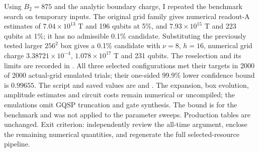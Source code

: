 \documentclass[11pt,a4paper]{article}
\begin{document}
Using $B_2=875$ and the analytic boundary charge, I repeated the benchmark
search on temporary inputs. The original grid family gives numerical
readout-A estimates of $7.04\times10^{13}$ T and 196 qubits at 5\%, and
$7.93\times10^{15}$ T and 223 qubits at 1\%; it has no admissible 0.1\%
candidate. Substituting the previously tested larger $256^2$ box gives a
0.1\% candidate with $\nu=8$, $h=16$, numerical grid charge
$3.38721\times10^{-4}$, $1.078\times10^{17}$ T and 231 qubits. The
reselection and its limits are recorded in
. All three selected
configurations met their targets in 2000 of 2000 actual-grid emulated trials;
their one-sided 99.9\% lower confidence bound is $0.99655$. The script and
saved values are  and
. The expansion, box
evolution, amplitude estimates and circuit costs remain numerical or
uncompiled; the emulations omit GQSP truncation and gate synthesis. The bound
is for the benchmark and was not applied to the
parameter sweeps. Production tables are unchanged. Exit criterion:
independently review the all-time argument, enclose the remaining numerical
quantities, and regenerate the full selected-resource pipeline.
\end{document}
